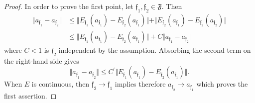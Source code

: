 \documentclass[10pt,a4paper]{amsart}
\begin{document}
\begin{proof}
In order to prove the first point, let $\mathfrak{f}_1,\mathfrak{f}_2 \in \mathfrak{F}$. Then 
\begin{align*}
\Vert a_{\mathfrak{f}_1} -a_{\mathfrak{f}_2} \Vert & \leq \Vert E_{\mathfrak{f}_1} (a_{\mathfrak{f}_1}) -E_{\mathfrak{f}_2}(a_{\mathfrak{f}_1}) \Vert + \Vert E_{\mathfrak{f}_2}(a_{\mathfrak{f}_1}) -E_{\mathfrak{f}_2}(a_{\mathfrak{f}_2}) \Vert \\
& \leq \Vert E_{\mathfrak{f}_1}(a_{\mathfrak{f}_1}) -E_{\mathfrak{f}_2}(a_{\mathfrak{f}_1}) \Vert +C \Vert a_{\mathfrak{f}_1} -a_{\mathfrak{f}_2} \Vert 
\end{align*}
where $C<1$ is $\mathfrak{f}_2$-independent by the assumption. Absorbing the second term on the right-hand side gives 
\begin{equation} \label{eq: continuity family contractions} 
\Vert a_{\mathfrak{f}_1} -a_{\mathfrak{f}_2} \Vert \leq C^\prime \Vert E_{\mathfrak{f}_1}(a_{\mathfrak{f}_1}) -E_{\mathfrak{f}_2}(a_{\mathfrak{f}_1}) \Vert.
\end{equation} 
When $E$ is continuous, then $\mathfrak{f}_2 \to \mathfrak{f}_1$ implies therefore $a_{\mathfrak{f}_2} \to a_{\mathfrak{f}_1}$ which proves the first assertion. 


\end{proof}
\end{document}
